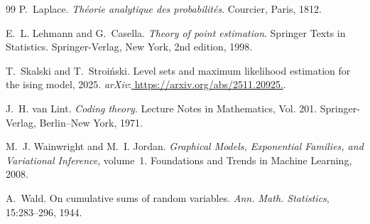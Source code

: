 \begin{thebibliography}{99}
P.~Laplace.
\newblock \emph{Théorie analytique des probabilités}.
\newblock Courcier, Paris, 1812.

E.~L. Lehmann and G.~Casella.
\newblock \emph{Theory of point estimation}.
\newblock Springer Texts in Statistics. Springer-Verlag, New York, 2nd edition, 1998.

T.~Skalski and T.~Stroiński.
\newblock Level sets and maximum likelihood estimation for the ising model, 2025.
\newblock \emph{arXiv}:\url{ https://arxiv.org/abs/2511.20925.}.

J.~H. van Lint.
\newblock \emph{Coding theory}.
\newblock Lecture Notes in Mathematics, Vol. 201. Springer-Verlag, Berlin–New York, 1971.

M.~J. Wainwright and M.~I. Jordan.
\newblock \emph{Graphical Models, Exponential Families, and Variational Inference}, volume~1.
\newblock Foundations and Trends in Machine Learning, 2008.

A.~Wald.
\newblock On cumulative sums of random variables.
\newblock \emph{Ann. Math. Statistics}, 15:283--296, 1944.

\end{thebibliography}